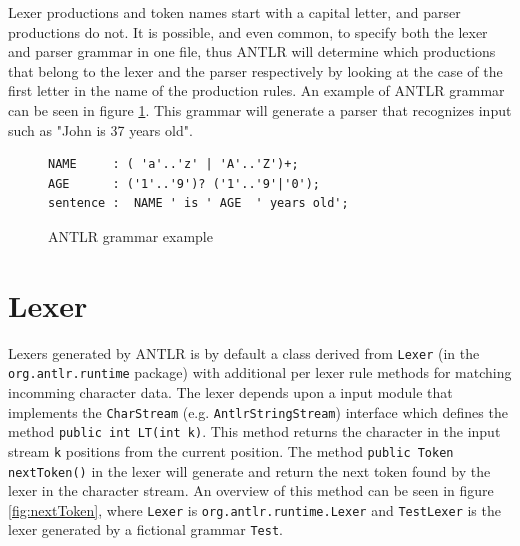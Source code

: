 Lexer productions and token names start with a capital letter, and parser productions do not. It is possible, and even common, to specify both the lexer and parser grammar in one file, thus ANTLR will determine which productions that belong to the lexer and the parser respectively by looking at the case of the first letter in the name of the production rules. An example of ANTLR grammar can be seen in figure \ref{code:simpleGrammar}. This grammar will generate a parser that recognizes input such as "John is 37 years old".
\begin{figure}[h!]
\begin{verbatim}
NAME     : ( 'a'..'z' | 'A'..'Z')+;  
AGE      : ('1'..'9')? ('1'..'9'|'0');
sentence :  NAME ' is ' AGE  ' years old';
\end{verbatim}
\caption{ANTLR grammar example}
\label{code:simpleGrammar}
\end{figure}

\section{Lexer}
\label{sect:antlr:lexer}
Lexers generated by ANTLR is by default a class derived from \verb!Lexer! (in the \verb!org.antlr.runtime! package) with additional per lexer rule methods for matching incomming character data. The lexer depends upon a input module that implements the \verb!CharStream! (e.g. \verb!AntlrStringStream!) interface which defines the method \verb!public int LT(int k)!. This method returns the character in the input stream \verb!k! positions from the current position. The method \verb!public Token nextToken()! in the lexer will generate and return the next token found by the lexer in the character stream. An overview of this method can be seen in figure \ref{fig:nextToken}, where \verb!Lexer! is \verb!org.antlr.runtime.Lexer! and \verb!TestLexer! is the lexer generated by a fictional grammar \verb!Test!.

